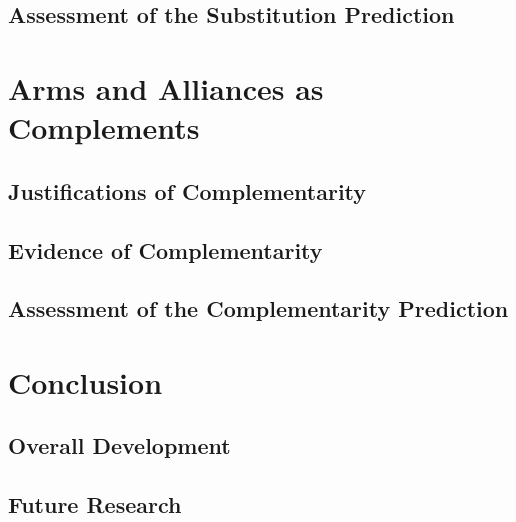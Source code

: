 \documentclass[12pt]{article}
\begin{document}
\subsection{Assessment of the Substitution Prediction}







\section{Arms and Alliances as Complements}



\subsection{Justifications of Complementarity} 





\subsection{Evidence of Complementarity} 





\subsection{Assessment of the Complementarity Prediction} 






\section{Conclusion}



\subsection{Overall Development}




\subsection{Future Research}
\end{document}
